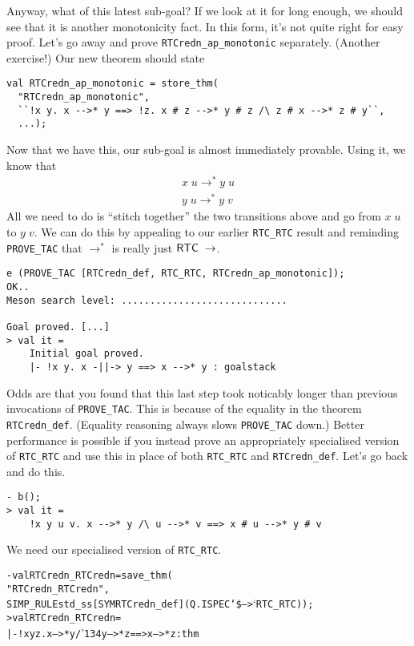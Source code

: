 \documentclass[12pt]{article}
\newcommand{\bk}{\char'134}
\begin{document}
    Anyway, what of this latest sub-goal?  If we look at it for long
    enough, we should see that it is another monotonicity fact.  In
    this form, it's not quite right for easy proof.  Let's go away and
    prove \texttt{RTCredn\_ap\_monotonic} separately. (Another
    exercise!)  Our new theorem should state
\begin{session}\begin{verbatim}
val RTCredn_ap_monotonic = store_thm(
  "RTCredn_ap_monotonic",
  ``!x y. x -->* y ==> !z. x # z -->* y # z /\ z # x -->* z # y``,
  ...);
\end{verbatim}\end{session}
    Now that we have this, our sub-goal is almost immediately
    provable.  Using it, we know that \[\begin{array}{c}
      x\;u \rightarrow^* y\;u \\
      y\;u \rightarrow^* y\;v
    \end{array}\]
    All we need to do is ``stitch together'' the two transitions above
    and go from $x\;u$ to $y\;v$.  We can do this by appealing to our
    earlier \texttt{RTC\_RTC} result and reminding \texttt{PROVE\_TAC}
    that $\rightarrow^*$ is really just
    ${\sf RTC}\;\rightarrow$.
\begin{session}\begin{verbatim}
e (PROVE_TAC [RTCredn_def, RTC_RTC, RTCredn_ap_monotonic]);
OK..
Meson search level: .............................

Goal proved. [...]
> val it =
    Initial goal proved.
    |- !x y. x -||-> y ==> x -->* y : goalstack
\end{verbatim}\end{session}
Odds are that you found that this last step took noticably longer than
previous invocations of \texttt{PROVE\_TAC}.  This is because of the
equality in the theorem \texttt{RTCredn\_def}.  (Equality reasoning
always slows \texttt{PROVE\_TAC} down.) Better performance is possible
if you instead prove an appropriately specialised version of
\texttt{RTC\_RTC} and use this in place of both \texttt{RTC\_RTC} and
\texttt{RTCredn\_def}.  Let's go back and do this.
\begin{session}\begin{verbatim}
- b();
> val it =
    !x y u v. x -->* y /\ u -->* v ==> x # u -->* y # v
\end{verbatim}\end{session}
We need our specialised version of \texttt{RTC\_RTC}.
\begin{session}\begin{alltt}
- val RTCredn_RTCredn = save_thm(
    "RTCredn_RTCredn",
    SIMP_RULE std_ss [SYM RTCredn_def] (Q.ISPEC `\$-->` RTC_RTC));
> val RTCredn_RTCredn =
    |- !x y z. x -->* y /\bk{} y -->* z ==> x -->* z : thm
\end{alltt}\end{session}
\end{document}
